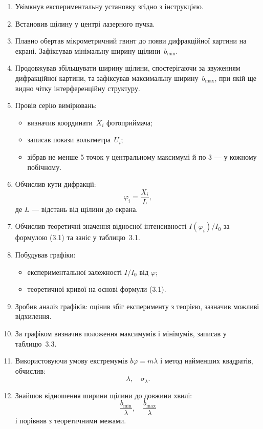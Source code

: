 \documentclass[12pt,a4paper]{article}
\begin{document}
    \begin{enumerate}
    \item Увімкнув експериментальну установку згідно з інструкцією.
    \item Встановив щілину у центрі лазерного пучка.
    \item Плавно обертав мікрометричний гвинт до появи дифракційної картини на екрані. Зафіксував мінімальну ширину щілини~$b_{\min}$.
    \item Продовжував збільшувати ширину щілини, спостерігаючи за звуженням дифракційної картини, та зафіксував максимальну ширину~$b_{\max}$, при якій ще видно чітку інтерференційну структуру.
    \item Провів серію вимірювань:
        \begin{itemize}
        \item визначив координати~$X_i$ фотоприймача;
        \item записав покази вольтметра~$U_i$;
        \item зібрав не менше 5 точок у центральному максимумі й по 3 — у кожному побічному.
        \end{itemize}
    \item Обчислив кути дифракції:
        \[
        \varphi_i = \frac{X_i}{L},
        \]
        де $L$ — відстань від щілини до екрана.
    \item Обчислив теоретичні значення відносної інтенсивності $I(\varphi_i)/I_0$ за формулою (3.1) та заніс у таблицю~3.1.
    \item Побудував графіки:
        \begin{itemize}
        \item експериментальної залежності $I/I_0$ від $\varphi$;
        \item теоретичної кривої на основі формули (3.1).
        \end{itemize}
    \item Зробив аналіз графіків: оцінив збіг експерименту з теорією, зазначив можливі відхилення.
    \item За графіком визначив положення максимумів і мінімумів, записав у таблицю~3.3.
    \item Використовуючи умову екстремумів $b\varphi = m\lambda$ і метод найменших квадратів, обчислив:
        \[
        \lambda, \quad \sigma_\lambda.
        \]
    \item Знайшов відношення ширини щілини до довжини хвилі:
        \[
        \frac{b_{\min}}{\lambda}, \quad \frac{b_{\max}}{\lambda}
        \]
        і порівняв з теоретичними межами.
    \end{enumerate}
\end{document}
